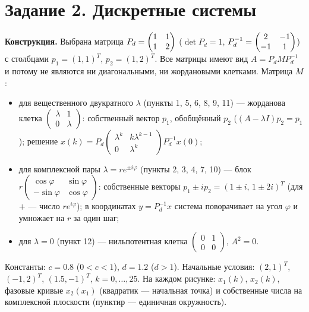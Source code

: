 \documentclass[a4paper, 12pt]{article}
\begin{document}
    \section{Задание 2. Дискретные системы}
    \textbf{Конструкция.} Выбрана матрица $P_d=\begin{pmatrix}1 & 1 \\ 1 & 2\end{pmatrix}$ ($\det P_d=1$, $P_d^{-1}=\begin{pmatrix}2 & -1 \\ -1 & 1\end{pmatrix}$) с столбцами $p_1=(1,1)^T$, $p_2=(1,2)^T$. Все матрицы имеют вид $A=P_dMP_d^{-1}$ и потому не являются ни диагональными, ни жордановыми клетками. Матрица $M$:
    \begin{itemize}
        \item для вещественного двукратного $\lambda$ (пункты 1, 5, 6, 8, 9, 11) --- жорданова клетка $\begin{pmatrix}\lambda&1\\0&\lambda\end{pmatrix}$: собственный вектор $p_1$, обобщённый $p_2$ ($(A-\lambda I)p_2=p_1$); решение $x(k)=P_d\begin{pmatrix}\lambda^k&k\lambda^{k-1}\\0&\lambda^k\end{pmatrix}P_d^{-1}x(0)$;
        \item для комплексной пары $\lambda=re^{\pm i\varphi}$ (пункты 2, 3, 4, 7, 10) --- блок $r\begin{pmatrix}\cos\varphi&\sin\varphi\\-\sin\varphi&\cos\varphi\end{pmatrix}$: собственные векторы $p_1\pm ip_2=(1\pm i,\,1\pm2i)^T$ (для $+$ --- число $re^{i\varphi}$); в координатах $y=P_d^{-1}x$ система поворачивает на угол $\varphi$ и умножает на $r$ за один шаг;
        \item для $\lambda=0$ (пункт 12) --- нильпотентная клетка $\begin{pmatrix}0&1\\0&0\end{pmatrix}$, $A^2=0$.
    \end{itemize}
    Константы: $c=0.8$ ($0<c<1$), $d=1.2$ ($d>1$). Начальные условия: $(2,1)^T$, $(-1,2)^T$, $(1.5,-1)^T$, $k=0,\dots,25$. На каждом рисунке: $x_1(k)$, $x_2(k)$, фазовые кривые $x_2(x_1)$ (квадратик --- начальная точка) и собственные числа на комплексной плоскости (пунктир --- единичная окружность).
\end{document}
